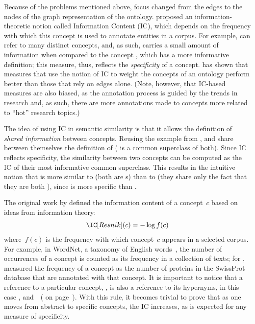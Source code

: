 Because of the problems mentioned above, focus changed from the edges to the nodes of the graph representation of the ontology. \citet{Resnik1995} proposed an information-theoretic notion called Information Content (IC), which depends on the frequency with which this concept is used to annotate entities in a corpus. For example,  can refer to many distinct concepts, and, as such, carries a small amount of information when compared to the concept , which has a more informative definition; this measure, thus, reflects the \emph{specificity} of a concept. \citet{Resnik1995} has shown that measures that use the notion of IC to weight the concepts of an ontology perform better than those that rely on edges alone. (Note, however, that IC-based measures are also biased, as the annotation process is guided by the trends in research and, as such, there are more annotations made to concepts more related to ``hot'' research topics.)

The idea of using IC in semantic similarity is that it allows the definition of \emph{shared information} between concepts. Reusing the example from ,  and  share between themselves the definition of  (\ie {} is a common superclass of both). Since IC reflects specificity, the similarity between two concepts can be computed as the IC of their most informative common superclass. This results in the intuitive notion that  is more similar to  (both are s) than to  (they share only the fact that they are both ), since  is more specific than .

The original work by \citet{Resnik1995, Resnik1999} defined the information content of a concept~$c$ based on ideas from information theory:
\begin{equation}
    \IC[Resnik](c) = -\log f(c)
    \label{eq:resnik-ic}
\end{equation}
where~$f(c)$ is the frequency with which concept~$c$ appears in a selected corpus. For example, in WordNet, a taxonomy of English words~\citep{Miller1995}, the number of occurrences of a concept is counted as its frequency in a collection of texts; for , \citet{Lord2003} measured the frequency of a concept as the number of proteins in the SwissProt database that are annotated with that concept. It is important to notice that a reference to a particular concept, \eg {}, is also a reference to its hypernyms, in this case ,  and~~(\cf {} on page~\pageref{fig:anatomy-ontology}). With this rule, it becomes trivial to prove that as one moves from abstract to specific concepts, the IC increases, as is expected for any measure of specificity.

